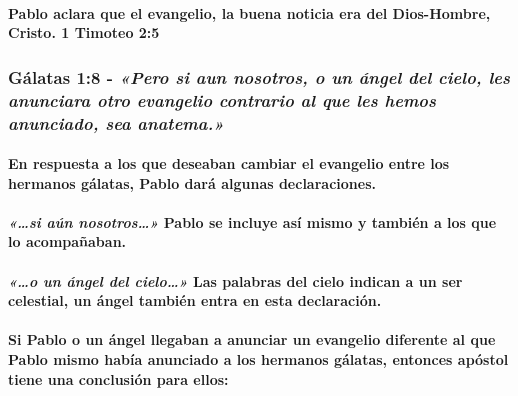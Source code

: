 \documentclass[11a pt,twoside]{article}
\newcommand{\scripture}[1]{%
  {\fontsize{12pt}{16pt}\selectfont\ScriptureFont\itshape #1}%
}
\let\oldsubsubsection\subsubsection
\renewcommand{\subsubsection}{\needspace{4\baselineskip}\oldsubsubsection}
\let\oldparagraph\paragraph
\renewcommand{\paragraph}{\needspace{3\baselineskip}\oldparagraph}
\begin{document}
\paragraph{Pablo aclara que el evangelio, la buena noticia era del
Dios-Hombre, Cristo. 1 Timoteo
2:5}\label{pablo-aclara-que-el-evangelio-la-buena-noticia-era-del-dios-hombre-cristo.-1-timoteo-25}

\subsubsection{\texorpdfstring{Gálatas 1:8 -
\scripture{«Pero si aun nosotros, o un ángel del cielo, les anunciara otro evangelio contrario al que les hemos anunciado, sea anatema.»}}{Gálatas 1:8 - }}\label{guxe1latas-18---pero-si-aun-nosotros-o-un-uxe1ngel-del-cielo-les-anunciara-otro-evangelio-contrario-al-que-les-hemos-anunciado-sea-anatema.}

\paragraph{En respuesta a los que deseaban cambiar el evangelio entre
los hermanos gálatas, Pablo dará algunas
declaraciones.}\label{en-respuesta-a-los-que-deseaban-cambiar-el-evangelio-entre-los-hermanos-guxe1latas-pablo-daruxe1-algunas-declaraciones.}

\paragraph{\texorpdfstring{\scripture{«…si aún nosotros…»} Pablo se
incluye así mismo y también a los que lo
acompañaban.}{ Pablo se incluye así mismo y también a los que lo acompañaban.}}\label{si-auxfan-nosotros-pablo-se-incluye-asuxed-mismo-y-tambiuxe9n-a-los-que-lo-acompauxf1aban.}

\paragraph{\texorpdfstring{\scripture{«…o un ángel del cielo…»} Las
palabras del cielo indican a un ser celestial, un ángel también entra en
esta
declaración.}{ Las palabras del cielo indican a un ser celestial, un ángel también entra en esta declaración.}}\label{o-un-uxe1ngel-del-cielo-las-palabras-del-cielo-indican-a-un-ser-celestial-un-uxe1ngel-tambiuxe9n-entra-en-esta-declaraciuxf3n.}

\paragraph{Si Pablo o un ángel llegaban a anunciar un evangelio
diferente al que Pablo mismo había anunciado a los hermanos gálatas,
entonces apóstol tiene una conclusión para
ellos:}\label{si-pablo-o-un-uxe1ngel-llegaban-a-anunciar-un-evangelio-diferente-al-que-pablo-mismo-habuxeda-anunciado-a-los-hermanos-guxe1latas-entonces-apuxf3stol-tiene-una-conclusiuxf3n-para-ellos}
\end{document}

